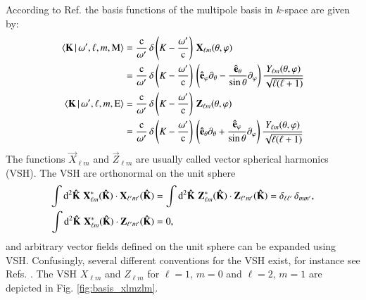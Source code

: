According to Ref. \cite{PhotonsAndAtoms} the basis functions of the multipole
basis in $k$-space are given by:
\begin{align}
\nonumber
\braket{{\mathbf{K}}\, | \, \omega^\prime, \ell, m, \text{M}} &= \frac{\mathrm{c}}{\omega^\prime} \, \delta\left(K-\frac{\omega^\prime}{\mathrm{c}}\right) \, {\mathbf{X}}_{\ell m} (\theta, \varphi) \\
&= \frac{\mathrm{c}}{\omega^\prime} \, \delta\left(K-\frac{\omega^\prime}{\mathrm{c}}\right) \, \left({\mathbf{\hat e}}_\varphi \partial_\theta - \frac{{\mathbf{\hat e}}_\theta}{\sin\theta} \partial_\varphi\right)\frac{Y_{\ell m}(\theta,\varphi)}{\sqrt{\ell(\ell+1)}} \\
\nonumber
\braket{{\mathbf{K}}\, | \, \omega^\prime, \ell, m, \text{E}} &= \frac{\mathrm{c}}{\omega^\prime} \, \delta\left(K-\frac{\omega^\prime}{\mathrm{c}}\right) \, {\mathbf{Z}}_{\ell m} (\theta, \varphi) \\
&= \frac{\mathrm{c}}{\omega^\prime} \, \delta\left(K-\frac{\omega^\prime}{\mathrm{c}}\right) \, \left({\mathbf{\hat e}}_\theta \partial_\theta + \frac{{\mathbf{{\mathbf{\hat e}}}}_\varphi}{\sin\theta} \partial_\varphi\right)\frac{Y_{\ell m}(\theta,\varphi)}{\sqrt{\ell(\ell+1)}}
\end{align}
The functions $\vec X_{\ell m}$ and $\vec Z_{\ell m}$ are usually called vector
spherical harmonics (VSH). The VSH are orthonormal on the unit sphere
\begin{align}
\int \mathrm{d}^2 {\mathbf{\hat K}} \, \, {\mathbf{X}}^*_{\ell m}({\mathbf{\hat K}}) \cdot {\mathbf{X}}_{\ell^\prime m^\prime}({\mathbf{\hat K}}) &= \int \mathrm{d}^2 {\mathbf{\hat K}} \, \, {\mathbf{Z}}^*_{\ell m}({\mathbf{\hat K}}) \cdot {\mathbf{Z}}_{\ell^\prime m^\prime}({\mathbf{\hat K}}) = \delta_{\ell \ell^\prime} \, \delta_{m m^\prime}, \\
\int \mathrm{d}^2 {\mathbf{\hat K}} \, \, {\mathbf{X}}^*_{\ell m}({\mathbf{\hat K}}) \cdot {\mathbf{Z}}_{\ell^\prime m^\prime}({\mathbf{\hat K}}) &= 0,
\end{align}
and arbitrary vector fields defined on the unit sphere can be expanded using
VSH. Confusingly, several different conventions for the VSH exist, for instance see
Refs. \cite{VSH2,
biedenharn, bohrenhuffman, VSH1}. The VSH $X_{\ell m}$ and $Z_{\ell m}$ for $\ell=1$, $m=0$ and
$\ell=2$, $m=1$ are depicted in Fig. \ref{fig:basis_xlmzlm}.

